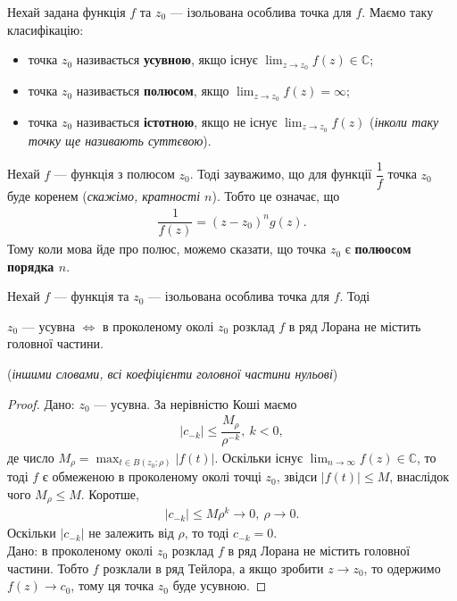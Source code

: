 \documentclass{math_library}
\begin{document}
\begin{definition}
Нехай задана функція $f$ та $z_0$ --- ізольована особлива точка для $f$. Маємо таку класифікацію:
\begin{itemize}[nosep,wide=0pt]
\item точка $z_0$ називається \textbf{усувною}, якщо існує $\displaystyle\lim_{z \to z_0} f(z) \in \mathbb{C}$; 
\item точка $z_0$ називається \textbf{полюсом}, якщо $\displaystyle\lim_{z \to z_0} f(z) = \infty$;
\item точка $z_0$ називається \textbf{істотною}, якщо не існує $\displaystyle\lim_{z \to z_0} f(z)$ (\textit{інколи таку точку ще називають суттєвою}).
\end{itemize}
\end{definition}

\begin{remark}
Нехай $f$ --- функція з полюсом $z_0$. Тоді зауважимо, що для функції $\dfrac{1}{f}$ точка $z_0$ буде коренем (\textit{скажімо, кратності $n$}). Тобто це означає, що
\begin{align*}
\dfrac{1}{f(z)} = (z-z_0)^n g(z).
\end{align*}
Тому коли мова йде про полюс, можемо сказати, що точка $z_0$ є \textbf{полюосом порядка $n$}.
\end{remark}

\begin{proposition}
Нехай $f$ --- функція та $z_0$ --- ізольована особлива точка для $f$. Тоді
\begin{center}
$z_0$ --- усувна $\iff$ в проколеному околі $z_0$ розклад $f$ в ряд Лорана не містить головної частини.
\end{center}
(\textit{іншими словами, всі коефіцієнти головної частини нульові})
\end{proposition}

\begin{proof}
\rightproof Дано: $z_0$ --- усувна. За нерівністю Коші маємо
\begin{align*}
|c_{-k}| \leq \dfrac{M_\rho}{\rho^{-k}},\ k < 0,
\end{align*}
де число $M_\rho = \displaystyle\max_{t \in B(z_0;\rho)} |f(t)|$. Оскільки існує $\displaystyle\lim_{n \to \infty} f(z) \in \mathbb{C}$, то тоді $f$ є обмеженою в проколеному околі точці $z_0$, звідси $|f(t)| \leq M$, внаслідок чого $M_\rho \leq M$. Коротше,
\begin{align*}
|c_{-k}| \leq M \rho^k \to 0,\ \rho \to 0.
\end{align*}
Оскільки $|c_{-k}|$ не залежить від $\rho$, то тоді $c_{-k} = 0$.
\bigskip \\
\leftproof Дано: в проколеному околі $z_0$ розклад $f$ в ряд Лорана не містить головної частини. Тобто $f$ розклали в ряд Тейлора, а якщо зробити $z \to z_0$, то одержимо $f(z) \to c_0$, тому ця точка  $z_0$ буде усувною.
\end{proof}
\end{document}
